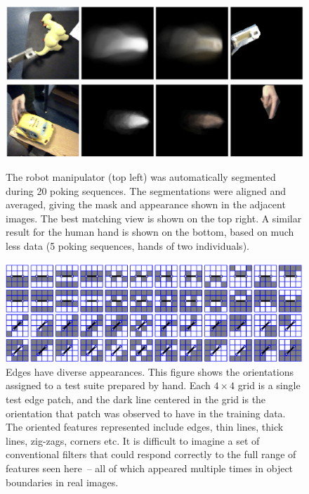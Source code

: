 \begin{figure}[tb]
\begin{center}
\includegraphics[width=\columnwidth]{fig-auto-proto-flipper.eps}\\
\includegraphics[width=\columnwidth]{fig-auto-proto-hand.eps}
\caption{ 
\label{fig:auto-proto-flipper}
%
The robot manipulator (top left) was automatically segmented during 20
poking sequences.  The segmentations were aligned and averaged, giving
the mask and appearance shown in the adjacent images.  The best
matching view is shown on the top right.  A similar result for the
human hand is shown on the bottom, based on much less data (5 poking
sequences, hands of two individuals).
%
}
\end{center}
\end{figure}



\begin{figure}[bt]
\includegraphics[width=\columnwidth]{seen-selected}
\caption
{
\label{fig:seen-selected}
%
Edges have diverse appearances.  This figure shows 
the orientations assigned to a test suite
prepared by hand.  Each $4\times 4$ grid is a single test
edge patch, and the dark line centered in the grid is the orientation
that patch was observed to have in the training data.
The oriented features represented
include edges, thin lines, thick lines, zig-zags, corners
etc.  It is difficult to imagine a set of conventional
filters that could respond correctly to the full range of 
features seen here~-- all of which appeared multiple
times in object boundaries in real images.
%
}
\end{figure}


